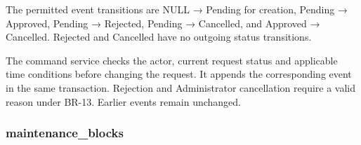 \vspace{2mm}

The permitted event transitions are NULL → Pending for creation, Pending → Approved, Pending → Rejected, Pending → Cancelled, and Approved → Cancelled. Rejected and Cancelled have no outgoing status transitions.\par

The command service checks the actor, current request status and applicable time conditions before changing the request. It appends the corresponding event in the same transaction. Rejection and Administrator cancellation require a valid reason under BR-13. Earlier events remain unchanged.\par

\subsubsection{maintenance\allowbreak\_\allowbreak{}blocks}


